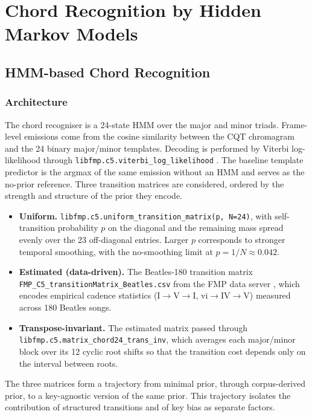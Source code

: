 \documentclass{article}
\begin{document}
\section{Chord Recognition by Hidden Markov Models}

\subsection{HMM-based Chord Recognition}

\subsubsection{Architecture}
The chord recogniser is a 24-state HMM over the major and minor triads. Frame-level emissions come from the cosine similarity between the CQT chromagram and the 24 binary major/minor templates. Decoding is performed by Viterbi log-likelihood through \texttt{libfmp.c5.viterbi\_log\_likelihood} \cite{mueller2015fmp}. The baseline template predictor is the argmax of the same emission without an HMM and serves as the no-prior reference. Three transition matrices are considered, ordered by the strength and structure of the prior they encode.
\begin{itemize}
    \item \textbf{Uniform.} \texttt{libfmp.c5.uniform\_transition\_matrix(p, N=24)}, with self-transition probability $p$ on the diagonal and the remaining mass spread evenly over the 23 off-diagonal entries. Larger $p$ corresponds to stronger temporal smoothing, with the no-smoothing limit at $p = 1/N \approx 0.042$.
    \item \textbf{Estimated (data-driven).} The Beatles-180 transition matrix \texttt{FMP\_C5\_transitionMatrix\_Beatles.csv} from the FMP data server \cite{mueller2015fmp}, which encodes empirical cadence statistics (I$\to$V$\to$I, vi$\to$IV$\to$V) measured across 180 Beatles songs.
    \item \textbf{Transpose-invariant.} The estimated matrix passed through \texttt{libfmp.c5.matrix\_chord24\_trans\_inv}, which averages each major/minor block over its 12 cyclic root shifts so that the transition cost depends only on the interval between roots.
\end{itemize}

The three matrices form a trajectory from minimal prior, through corpus-derived prior, to a key-agnostic version of the same prior. This trajectory isolates the contribution of structured transitions and of key bias as separate factors.
\end{document}
